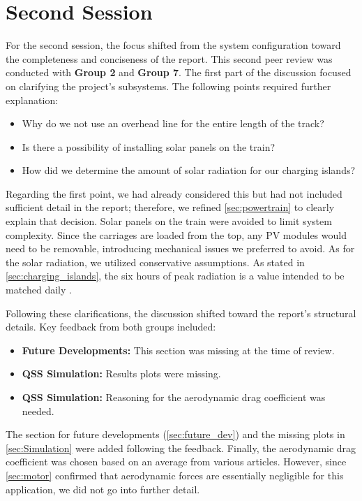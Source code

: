 \section{Second Session}

For the second session, the focus shifted from the system configuration toward the completeness and conciseness of the report. This second peer review was conducted with \textbf{Group 2} and \textbf{Group 7}. The first part of the discussion focused on clarifying the project's subsystems. The following points required further explanation:

\begin{itemize}
\item Why do we not use an overhead line for the entire length of the track?
\item Is there a possibility of installing solar panels on the train?
\item How did we determine the amount of solar radiation for our charging islands?
\end{itemize}

Regarding the first point, we had already considered this but had not included sufficient detail in the report; therefore, we refined \autoref{sec:powertrain} to clearly explain that decision. Solar panels on the train were avoided to limit system complexity. Since the carriages are loaded from the top, any PV modules would need to be removable, introducing mechanical issues we preferred to avoid. As for the solar radiation, we utilized conservative assumptions. As stated in \autoref{sec:charging_islands}, the six hours of peak radiation is a value intended to be matched daily \cite{jafar2022sahara}.

Following these clarifications, the discussion shifted toward the report's structural details. Key feedback from both groups included:

\begin{itemize}
\item \textbf{Future Developments:} This section was missing at the time of review.
\item \textbf{QSS Simulation:} Results plots were missing.
\item \textbf{QSS Simulation:} Reasoning for the aerodynamic drag coefficient was needed.
\end{itemize}

The section for future developments (\autoref{sec:future_dev}) and the missing plots in \autoref{sec:Simulation} were added following the feedback. Finally, the aerodynamic drag coefficient was chosen based on an average from various articles. However, since \autoref{sec:motor} confirmed that aerodynamic forces are essentially negligible for this application, we did not go into further detail.